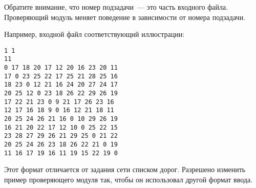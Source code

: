 Обратите внимание, что номер подзадачи~--- это часть входного файла. Проверяющий модуль
меняет поведение в зависимости от номера подзадачи.

Например, входной файл соответствующий иллюстрации:

\begin{verbatim}
1 1
11
0 17 18 20 17 12 20 16 23 20 11
17 0 23 25 22 17 25 21 28 25 16
18 23 0 12 21 16 24 20 27 24 17
20 25 12 0 23 18 26 22 29 26 19
17 22 21 23 0 9 21 17 26 23 16
12 17 16 18 9 0 16 12 21 18 11
20 25 24 26 21 16 0 10 29 26 19
16 21 20 22 17 12 10 0 25 22 15
23 28 27 29 26 21 29 25 0 21 22
20 25 24 26 23 18 26 22 21 0 19
11 16 17 19 16 11 19 15 22 19 0
\end{verbatim}

Этот формат отличается от задания сети списком дорог. Разрешено изменить пример
проверяющего модуля так, чтобы он использовал другой формат ввода.